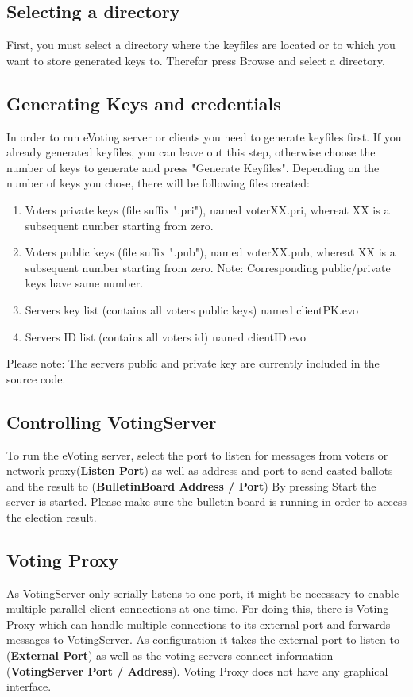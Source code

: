 \documentclass{article}
\begin{document}
\subsection{Selecting a directory}
First, you must select a directory where the keyfiles are located or to which you want to store generated keys to. Therefor press Browse and select a directory.

\subsection{Generating Keys and credentials}
In order to run eVoting server or clients you need to generate keyfiles first. If you already generated keyfiles, you can leave out this step, otherwise choose the number of keys to generate and press "Generate Keyfiles". Depending on the number of keys you chose, there will be following files created:
\begin{enumerate}
	\item Voters private keys (file suffix ".pri"), named voterXX.pri, whereat XX is a subsequent number starting from zero.
	\item Voters public keys (file suffix ".pub"), named voterXX.pub, whereat XX is a subsequent number starting from zero. Note: Corresponding public/private keys have same number.
	\item Servers key list (contains all voters public keys) named clientPK.evo
	\item Servers ID list (contains all voters id) named clientID.evo
\end{enumerate}
Please note: The servers public and private key are currently included in the source code.

\subsection{Controlling VotingServer}
To run the eVoting server, select the port to listen for messages from voters or network proxy(\textbf{Listen Port}) as well as address and port to send casted ballots and the result to (\textbf{BulletinBoard Address / Port})
By pressing Start the server is started. Please make sure the bulletin board is running in order to access the election result.

\subsection{Voting Proxy}
As VotingServer only serially listens to one port, it might be necessary to enable multiple parallel client connections at one time. For doing this, there is Voting Proxy which can handle multiple connections to its external port and forwards messages to VotingServer. As configuration it takes the external port to listen to (\textbf{External Port}) as well as the voting servers connect information (\textbf{VotingServer Port / Address}). Voting Proxy does not have any graphical interface.
\end{document}

